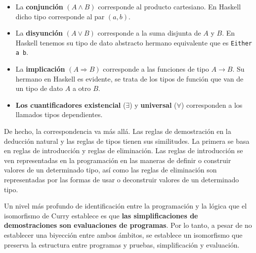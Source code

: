 \vspace{5mm}
\begin{itemize}
\item La \textbf{conjunción} $(A\wedge B)$ corresponde al producto cartesiano.
  En Haskell dicho tipo corresponde al par $(a,b)$.
\item La \textbf{disyunción} $(A\vee B)$ corresponde a la suma disjunta de $A$
  y $B$. En Haskell tenemos su tipo de dato abstracto hermano equivalente que es
  \texttt{Either a b}.
\item La \textbf{implicación} $(A \Rightarrow B)$ corresponde a las funciones de
  tipo $A\rightarrow B$. Su hermano en Haskell es evidente, se trata de los tipos
  de función que van de un tipo de dato $A$ a otro $B$.
\item \textbf{Los cuantificadores existencial} ($\exists$) y \textbf{universal}
  ($\forall$) corresponden a los llamados tipos dependientes.
\end{itemize}

De hecho, la correspondencia va más allá. Las reglas de demostración en la deducción
natural y las reglas de tipos tienen sus similitudes. La primera se basa en reglas de introducción
y reglas de eliminación. Las reglas de introducción se ven representadas en la programación en las
maneras de definir o construir valores de un determinado tipo, así como las reglas de eliminación
son representadas por las formas de usar o deconstruir valores de un determinado tipo.

Un nivel más profundo de identificación entre la programación y la lógica que el
isomorfismo de Curry establece es que
\textbf{las simplificaciones de demostraciones son evaluaciones de programas}. Por lo tanto,
a pesar de no establecer una biyección entre ambos ámbitos, se establece un isomorfismo que preserva
la estructura entre programas y pruebas, simplificación y evaluación.



